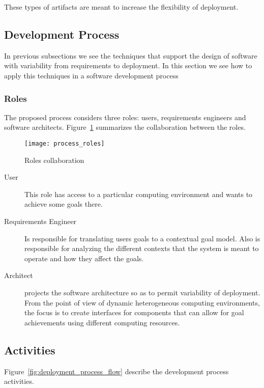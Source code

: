 These types of artifacts are meant to increase the flexibility of deployment.


\subsection{Development Process}

In previous subsections we see the techniques that support the design of software with variability from requirements to deployment. In this section we see how to apply this techniques in a software development process

\subsubsection{Roles}
The proposed process considers three roles: users, requirements engineers and software architects.
Figure~\ref{fig:process_roles} summarizes the collaboration between the roles.

 \begin{figure}[!htb]
   \centering
   \texttt{[image: process\_roles]}
   \caption{Roles collaboration}
 \label{fig:process_roles}
 \end{figure}

\begin{description}
  \item[User]
  This role has access to a particular computing environment and wants to achieve some goals there.
  \item[Requirements Engineer]
  Is responsible for translating users goals to a contextual goal model. Also is responsible for analyzing the different contexts that the system is meant to operate and how they affect the goals.
  \item[Architect] projects the software architecture so as to permit variability of deployment.
  From the point of view of dynamic heterogeneous computing environments, the focus is to create interfaces for components that can allow for goal achievements using different computing resources.

\end{description}



\subsection{Activities}

Figure~\ref{fig:deployment_process_flow} describe the development process activities.

